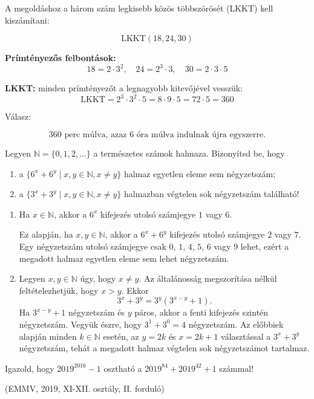 \begin{solution}
A megoldáshoz a három szám legkisebb közös többszörösét (LKKT) kell
kiszámítani:

\[
\text{LKKT}(18,24,30)
\]

\textbf{Prímtényezős felbontások:} 
\[
18=2\cdot3^{2},\quad24=2^{3}\cdot3,\quad30=2\cdot3\cdot5
\]

\textbf{LKKT:} minden prímtényezőt a legnagyobb kitevőjével vesszük:
\[
\text{LKKT}=2^{3}\cdot3^{2}\cdot5=8\cdot9\cdot5=72\cdot5=360
\]

Válasz:

\[
\boxed{360\text{ perc múlva, azaz 6 óra múlva indulnak újra egyszerre.}}
\]
\end{solution}
\begin{extraproblem}
Legyen $\mathbb{N}=\{0,1,2,\dots\}$ a természetes számok halmaza.
Bizonyítsd be, hogy 
\begin{enumerate}
\item a $\{6^{x}+6^{y}\mid x,y\in\mathbb{N},x\ne y\}$ halmaz egyetlen eleme
sem négyzetszám; 
\item a $\{3^{x}+3^{y}\mid x,y\in\mathbb{N},x\ne y\}$ halmazban végtelen
sok négyzetszám található! 
\end{enumerate}
\begin{enumerate}
\item Ha $x\in\mathbb{N}$, akkor a $6^{x}$ kifejezés utolsó számjegye
$1$ vagy $6$.

Ez alapján, ha $x,y\in\mathbb{N}$, akkor a $6^{x}+6^{y}$ kifejezés
utolsó számjegye $2$ vagy $7$. Egy négyzetszám utolsó számjegye
csak $0$, $1$, $4$, $5$, $6$ vagy $9$ lehet, ezért a megadott
halmaz egyetlen eleme sem lehet négyzetszám.
\item Legyen $x,y\in\mathbb{N}$ úgy, hogy $x\ne y$. Az általánosság megszorítása
nélkül feltételezhetjük, hogy $x>y$. Ekkor 
\[
3^{x}+3^{y}=3^{y}(3^{x-y}+1).
\]
Ha $3^{x-y}+1$ négyzetszám és $y$ páros, akkor a fenti kifejezés
szintén négyzetszám. Vegyük észre, hogy $3^{1}+3^{0}=4$ négyzetszám.
Az előbbiek alapján minden $k\in\mathbb{N}$ esetén, az $y=2k$ és
$x=2k+1$ választással a $3^{x}+3^{y}$ négyzetszám, tehát a megadott
halmaz végtelen sok négyzetszámot tartalmaz. 
\end{enumerate}
Igazold, hogy $2019^{2016}-1$ osztható a $2019^{84}+2019^{42}+1$
számmal!
\begin{flushright}
(EMMV, 2019, XI-XII. osztály, II. forduló) 
\par\end{flushright}
\end{extraproblem}

